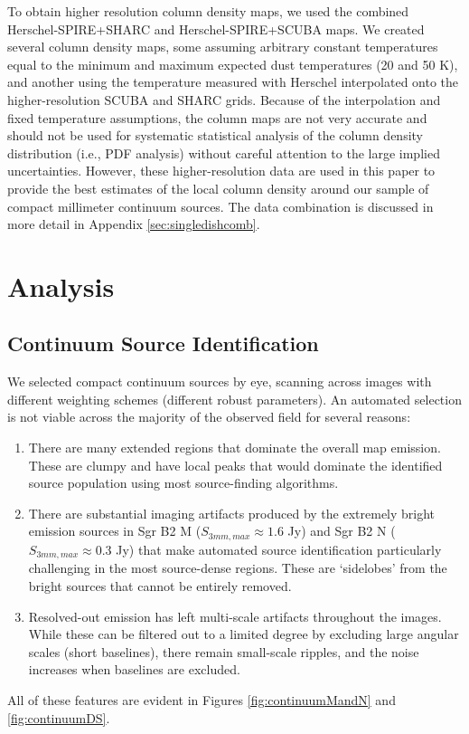 \documentclass[twocolumn]{aastex61}
\begin{document}
To obtain higher resolution column density maps, we used the combined
Herschel-SPIRE+SHARC and Herschel-SPIRE+SCUBA maps.
We created several column density maps, some assuming arbitrary constant
temperatures equal to the minimum and maximum expected dust temperatures (20
and 50 K), and another using the temperature measured with Herschel
interpolated onto the higher-resolution SCUBA and SHARC grids.  Because of the
interpolation and fixed temperature assumptions, the column maps are not very
accurate and should not be used for systematic statistical analysis of the
column density distribution (i.e., PDF analysis) without careful attention to
the large implied
uncertainties.  However, these higher-resolution data are used in this paper
to provide the best estimates of the local column density around our sample
of compact millimeter continuum sources.
The data combination is discussed in more detail in Appendix
\ref{sec:singledishcomb}.

\section{Analysis}

\subsection{Continuum Source Identification}
\label{sec:contsources}
We selected compact continuum  sources by eye,
scanning across images with different weighting schemes (different robust
parameters).  An automated selection is not viable across the majority of the
observed field for several reasons:
\begin{enumerate}
    \item There are many extended \hii regions that dominate the overall map
        emission.  These are clumpy and have local peaks that would dominate
        the identified source population using most source-finding algorithms.
    \item There are substantial imaging artifacts produced by the extremely
        bright emission sources in Sgr B2 M ($S_{3 mm,max} \approx 1.6$ Jy) and
        Sgr B2 N ($S_{3 mm,max} \approx 0.3$ Jy) that make automated source
        identification particularly challenging in the most source-dense
        regions.  These are `sidelobes' from the bright sources that cannot be
        entirely removed.
    \item Resolved-out emission has left multi-scale artifacts throughout the
        images.  While these can be filtered out to a limited degree by
        excluding large angular scales (short baselines), there remain
        small-scale ripples, and the noise increases when baselines are
        excluded.
\end{enumerate}
All of these features are evident in Figures \ref{fig:continuumMandN} and
\ref{fig:continuumDS}. 
\end{document}
